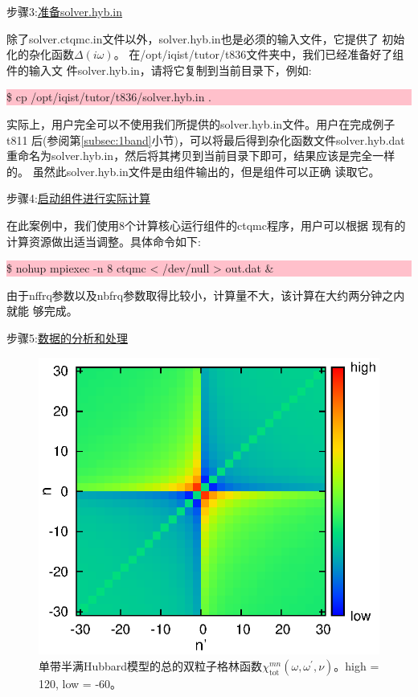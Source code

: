 步骤3:\underline{准备solver.hyb.in}

除了solver.ctqmc.in文件以外，solver.hyb.in也是必须的输入文件，它提供了
初始化的杂化函数$\Delta(i\omega)$。
在/opt/iqist/tutor/t836文件夹中，我们已经准备好了{\gardenia}组件的输入文
件solver.hyb.in，请将它复制到当前目录下，例如:

\noindent\colorbox{pink}{\parbox[r]{\linewidth}{\quad \$ cp /opt/iqist/tutor/t836/solver.hyb.in . }}

实际上，用户完全可以不使用我们所提供的solver.hyb.in文件。用户在完成例子t811
后(参阅第\ref{subsec:1band}小节)，可以将最后得到杂化函数文件solver.hyb.dat
重命名为solver.hyb.in，然后将其拷贝到当前目录下即可，结果应该是完全一样的。
虽然此solver.hyb.in文件是由{\azalea}组件输出的，但是{\gardenia}组件可以正确
读取它。

步骤4:\underline{启动{\gardenia}组件进行实际计算}

在此案例中，我们使用8个计算核心运行{\gardenia}组件的ctqmc程序，用户可以根据
现有的计算资源做出适当调整。具体命令如下:

\noindent\colorbox{pink}{\parbox[r]{\linewidth}{\quad \$ nohup mpiexec -n 8 ctqmc < /dev/null >  out.dat \&}}

由于nffrq参数以及nbfrq参数取得比较小，计算量不大，该计算在大约两分钟之内就能
够完成。

步骤5:\underline{数据的分析和处理}

\begin{figure}
\centering
\includegraphics[scale=1.05]{figure/v_t.eps}
\caption[总的双粒子格林函数$\chi^{mn}_{\text{tot}}(\omega,\omega^{\prime},\nu)$]
{单带半满Hubbard模型的总的双粒子格林函数$\chi^{mn}_{\text{tot}}(\omega,\omega^{\prime},\nu)$。high = 120, low = -60。} 
\label{fig:v_t}
\end{figure}


